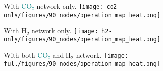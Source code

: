 \documentclass[12pt, aspectratio=169]{beamer}
\newcommand{\carbon}{\textcolor{teal}{CO$_2$}}
\newcommand{\hydrogen}{H$_2$}
\begin{document}
\begin{frame}
    \begin{center}
    With \carbon{} network only.
    \texttt{[image: co2-only/figures/90\_nodes/operation\_map\_heat.png]}
    \end{center}
\end{frame}

\begin{frame}
    \begin{center}
    With \hydrogen{} network only.
    \texttt{[image: h2-only/figures/90\_nodes/operation\_map\_heat.png]}
    \end{center}
\end{frame}


\begin{frame}
    \begin{center}
    With both \carbon{}  and \hydrogen{} network.
    \texttt{[image: full/figures/90\_nodes/operation\_map\_heat.png]}
    \end{center}
\end{frame}
\end{document}
